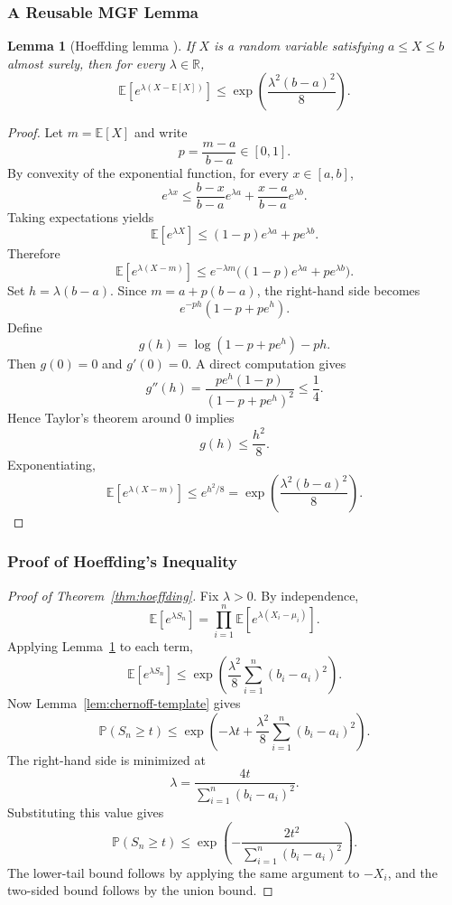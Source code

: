 \documentclass{article}
\newtheorem{lemma}[theorem]{Lemma}
\theoremstyle{definition}
\theoremstyle{remark}
\newcommand{\EE}{\mathbb{E}}
\newcommand{\PP}{\mathbb{P}}
\begin{document}
\subsubsection{A Reusable MGF Lemma}

\begin{lemma}[Hoeffding lemma \cite{Hoeffding1963}]
\label{lem:hoeffding-lemma}
If $X$ is a random variable satisfying $a \le X \le b$ almost surely, then for every $\lambda \in \mathbb{R}$,
$$
\EE[e^{\lambda (X-\EE[X])}]
\le
\exp\!\left(\frac{\lambda^2 (b-a)^2}{8}\right).
$$
\end{lemma}

\begin{proof}
Let $m=\EE[X]$ and write
$$
p = \frac{m-a}{b-a} \in [0,1].
$$
By convexity of the exponential function, for every $x \in [a,b]$,
$$
e^{\lambda x}
\le
\frac{b-x}{b-a} e^{\lambda a}
+
\frac{x-a}{b-a} e^{\lambda b}.
$$
Taking expectations yields
$$
\EE[e^{\lambda X}]
\le
(1-p)e^{\lambda a} + pe^{\lambda b}.
$$
Therefore
$$
\EE[e^{\lambda (X-m)}]
\le
e^{-\lambda m}\bigl((1-p)e^{\lambda a} + pe^{\lambda b}\bigr).
$$
Set $h=\lambda(b-a)$. Since $m=a+p(b-a)$, the right-hand side becomes
$$
e^{-ph}(1-p+pe^h).
$$
Define
$$
g(h) = \log(1-p+pe^h) - ph.
$$
Then $g(0)=0$ and $g'(0)=0$. A direct computation gives
$$
g''(h)
=
\frac{pe^h(1-p)}{(1-p+pe^h)^2}
\le
\frac{1}{4}.
$$
Hence Taylor's theorem around $0$ implies
$$
g(h) \le \frac{h^2}{8}.
$$
Exponentiating,
$$
\EE[e^{\lambda (X-m)}]
\le
e^{h^2/8}
=
\exp\!\left(\frac{\lambda^2(b-a)^2}{8}\right).
$$
\end{proof}

\subsubsection{Proof of Hoeffding's Inequality}

\begin{proof}[Proof of Theorem~\ref{thm:hoeffding}]
Fix $\lambda >0$. By independence,
$$
\EE[e^{\lambda S_n}]
=
\prod_{i=1}^n \EE[e^{\lambda (X_i-\mu_i)}].
$$
Applying Lemma~\ref{lem:hoeffding-lemma} to each term,
$$
\EE[e^{\lambda S_n}]
\le
\exp\!\left(
\frac{\lambda^2}{8}
\sum_{i=1}^n (b_i-a_i)^2
\right).
$$
Now Lemma~\ref{lem:chernoff-template} gives
$$
\PP(S_n \ge t)
\le
\exp\!\left(
-\lambda t + \frac{\lambda^2}{8}\sum_{i=1}^n (b_i-a_i)^2
\right).
$$
The right-hand side is minimized at
$$
\lambda
=
\frac{4t}{\sum_{i=1}^n (b_i-a_i)^2}.
$$
Substituting this value gives
$$
\PP(S_n \ge t)
\le
\exp\!\left(
-\frac{2t^2}{\sum_{i=1}^n (b_i-a_i)^2}
\right).
$$
The lower-tail bound follows by applying the same argument to $-X_i$, and the two-sided bound follows by the union bound.
\end{proof}
\end{document}

